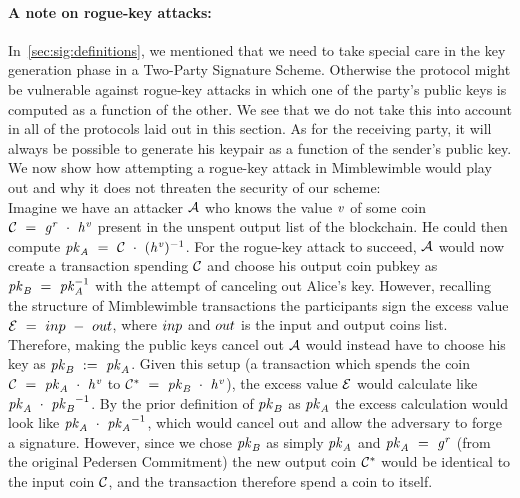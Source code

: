 \paragraph{A note on rogue-key attacks:} In~\cref{sec:sig:definitions}, we mentioned that we need to take special care in the key generation phase in a Two-Party Signature Scheme.
Otherwise the protocol might be vulnerable against rogue-key attacks in which one of the party's public keys is computed as a function of the other.
We see that we do not take this into account in all of the protocols laid out in this section.
As for the receiving party, it will always be possible to generate his keypair as a function of the sender's public key.
We now show how attempting a rogue-key attack in Mimblewimble would play out and why it does not threaten the security of our scheme:\\
Imagine we have an attacker $\mathcal{A}$ who knows the value $\mathit{v}$ of some coin $\mathcal{C} ~=~ \mathit{g}^{\mathit{r}} ~\cdot~ \mathit{h}^{\mathit{v}}$ present in the unspent output list of the blockchain.
He could then compute $\mathit{pk}_{\mathit{A}} ~=~ \mathcal{C} ~\cdot~ {(\mathit{h}^{\mathit{v}}})^{-1}$.
For the rogue-key attack to succeed, $\mathcal{A}$ would now create a transaction spending $\mathcal{C}$ and choose his output coin pubkey as $\mathit{pk}_{\mathit{B}} ~=~ \mathit{pk}_{\mathit{A}}^{-1}$ with the attempt of canceling out Alice's key.
However, recalling the structure of Mimblewimble transactions the participants sign the excess value $\mathcal{E} ~=~ inp ~-~ out$, where $inp$ and $out$ is the input and output coins list.
Therefore, making the public keys cancel out $\mathcal{A}$ would instead have to choose his key as $\mathit{pk}_{\mathit{B}} ~:=~ \mathit{pk}_{\mathit{A}}$.
Given this setup (a transaction which spends the coin $\mathcal{C} ~=~ \mathit{pk}_{\mathit{A}} ~\cdot~ \mathit{h}^{\mathit{v}}$ to $\mathcal{C}^* ~=~ \mathit{pk}_{\mathit{B}} ~\cdot~\mathit{h}^{\mathit{v}}$), the excess value $\mathcal{E}$ would calculate like $\mathit{pk}_{\mathit{A}} ~\cdot~ {\mathit{pk}_{\mathit{B}}}^{-1}$.
By the prior definition of $\mathit{pk}_{\mathit{B}}$ as $\mathit{pk}_{\mathit{A}}$ the excess calculation would look like $\mathit{pk}_{\mathit{A}} ~\cdot~ {\mathit{pk}_{\mathit{A}}}^{-1}$, which would cancel out and allow the adversary to forge a signature.
However, since we chose $\mathit{pk}_{\mathit{B}}$ as simply $\mathit{pk}_{\mathit{A}}$ and $\mathit{pk}_{\mathit{A}} ~=~ \mathit{g}^{\mathit{r}}$ (from the original Pedersen Commitment) the new output coin $\mathcal{C}^*$ would be identical to the input coin $\mathcal{C}$, and the transaction therefore spend a coin to itself.
